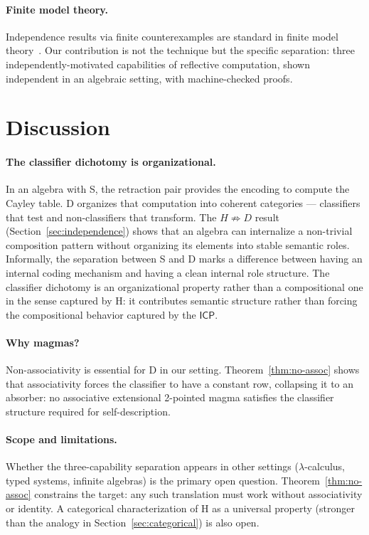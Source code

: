\documentclass[sigconf,screen,review,anonymous]{acmart}
\newcommand{\ICP}{\textsf{ICP}}
\begin{document}
\paragraph{Finite model theory.}
Independence results via finite counterexamples are standard in finite model theory~\cite{libkin04}. Our contribution is not the technique but the specific separation: three independently-motivated capabilities of reflective computation, shown independent in an algebraic setting, with machine-checked proofs.

\section{Discussion}
\label{sec:discussion}

\paragraph{The classifier dichotomy is organizational.}
In an algebra with S, the retraction pair provides the encoding to compute the Cayley table. D organizes that computation into coherent categories — classifiers that test and non-classifiers that transform. The $H \not\Rightarrow D$ result (Section~\ref{sec:independence}) shows that an algebra can internalize a non-trivial composition pattern without organizing its elements into stable semantic roles. Informally, the separation between S and D marks a difference between having an internal coding mechanism and having a clean internal role structure. The classifier dichotomy is an organizational property rather than a compositional one in the sense captured by H: it contributes semantic structure rather than forcing the compositional behavior captured by the $\ICP$.

\paragraph{Why magmas?}
Non-associativity is essential for D in our setting. Theorem~\ref{thm:no-assoc} shows that associativity forces the classifier to have a constant row, collapsing it to an absorber: no associative extensional 2-pointed magma satisfies the classifier structure required for self-description.

\paragraph{Scope and limitations.}
Whether the three-capability separation appears in other settings ($\lambda$-calculus, typed systems, infinite algebras) is the primary open question. Theorem~\ref{thm:no-assoc} constrains the target: any such translation must work without associativity or identity. A categorical characterization of H as a universal property (stronger than the analogy in Section~\ref{sec:categorical}) is also open.
\end{document}
